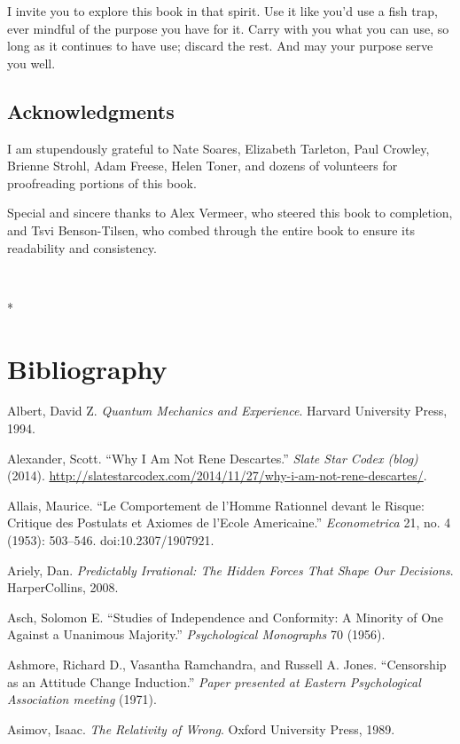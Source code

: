 \documentclass[letterpaper]{book}
\newcounter{mysection}
\newcommand{\mysectionnn}[1]{
  \section*{#1}
  \addcontentsline{toc}{section}{#1}
  \setcounter{footnote}{0}
}
\newcommand{\myendsectiontext}{
  {\centering
 \ ~
\par}

{\centering
 *
\par}
}
\begin{document}
{
 I invite you to explore this book in that spirit. Use it like
you'd use a fish trap, ever mindful of the purpose you
have for it. Carry with you what you can use, so long as it continues
to have use; discard the rest. And may your purpose serve you well.}


\subsection{Acknowledgments}

{
 I am stupendously grateful to Nate Soares, Elizabeth Tarleton,
Paul Crowley, Brienne Strohl, Adam Freese, Helen Toner, and dozens of
volunteers for proofreading portions of this book.}

{
 Special and sincere thanks to Alex Vermeer, who steered this book
to completion, and Tsvi Benson-Tilsen, who combed through the entire
book to ensure its readability and consistency.}

\myendsectiontext


\bigskip








\mysectionnn{Bibliography}

{
 Albert, David Z. \textit{Quantum Mechanics and Experience}.
Harvard University Press, 1994.}

{
 Alexander, Scott. ``Why I Am Not Rene
Descartes.'' \textit{Slate Star Codex (blog)} (2014).
\url{http://slatestarcodex.com/2014/11/27/why-i-am-not-rene-descartes/}.}

{
 Allais, Maurice. ``Le Comportement de
l'Homme Rationnel devant le Risque: Critique des
Postulats et Axiomes de l'Ecole
Americaine.'' \textit{Econometrica} 21, no. 4 (1953):
503--546. doi:10.2307/1907921.}

{
 Ariely, Dan. \textit{Predictably Irrational: The Hidden Forces
That Shape Our Decisions}. HarperCollins, 2008.}

{
 Asch, Solomon E. ``Studies of Independence and
Conformity: A Minority of One Against a Unanimous
Majority.'' \textit{Psychological Monographs} 70
(1956).}

{
 Ashmore, Richard D., Vasantha Ramchandra, and Russell A. Jones.
``Censorship as an Attitude Change
Induction.'' \textit{Paper presented at Eastern
Psychological Association meeting} (1971).}

{
 Asimov, Isaac. \textit{The Relativity of Wrong}. Oxford University
Press, 1989.}
\end{document}
